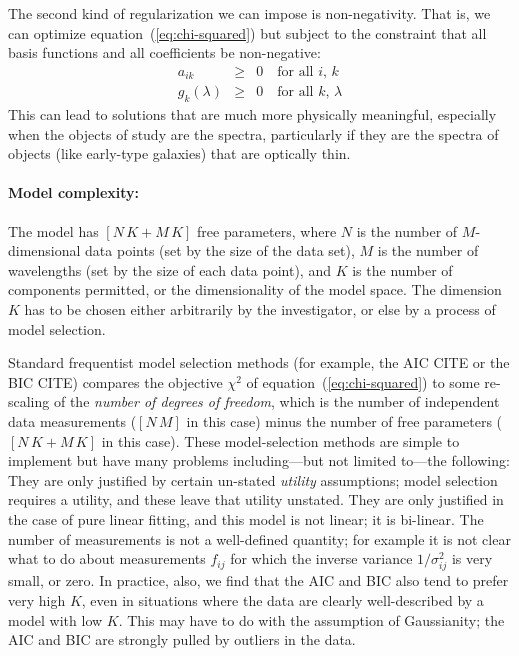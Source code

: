 \documentclass[12pt,preprint]{aastex}
\newcommand{\equationname}{equation}
\begin{document}
The second kind of regularization we can impose is non-negativity.
That is, we can optimize \equationname~(\ref{eq:chi-squared}) but subject
to the constraint that all basis functions and all coefficients be
non-negative:
\begin{eqnarray}\label{eq:non-negative}\displaystyle
a_{ik} & \geq & 0 \quad\mbox{for all $i$, $k$} \nonumber\\
g_{k}(\lambda) & \geq & 0 \quad\mbox{for all $k$, $\lambda$}
\end{eqnarray}
This can lead to solutions that are much more physically meaningful,
especially when the objects of study are the spectra, particularly if
they are the spectra of objects (like early-type galaxies) that are
optically thin.

\paragraph{Model complexity:}
The model has $[N\,K + M\,K]$ free parameters, where $N$ is the number
of $M$-dimensional data points (set by the size of the data set), $M$
is the number of wavelengths (set by the size of each data point), and
$K$ is the number of components permitted, or the dimensionality of
the model space.  The dimension $K$ has to be chosen either
arbitrarily by the investigator, or else by a process of model
selection.

Standard frequentist model selection methods (for example, the AIC
CITE or the BIC CITE) compares the objective $\chi^2$ of
\equationname~(\ref{eq:chi-squared}) to some re-scaling of the
\emph{number of degrees of freedom}, which is the number of independent
data measurements ($[N\,M]$ in this case) minus the number of free
parameters ($[N\,K + M\,K]$ in this case).  These model-selection
methods are simple to implement but have many problems
including---but not limited to---the following: They are only
justified by certain un-stated \emph{utility} assumptions; model
selection requires a utility, and these leave that utility unstated.
They are only justified in the case of pure linear fitting, and this
model is not linear; it is bi-linear.  The number of measurements is
not a well-defined quantity; for example it is not clear what to do
about measurements $f_{ij}$ for which the inverse variance
$1/\sigma^2_{ij}$ is very small, or zero.  In practice, also, we find
that the AIC and BIC also tend to prefer very high $K$, even in
situations where the data are clearly well-described by a model with
low $K$.  This may have to do with the assumption of Gaussianity; the
AIC and BIC are strongly pulled by outliers in the data.
\end{document}
